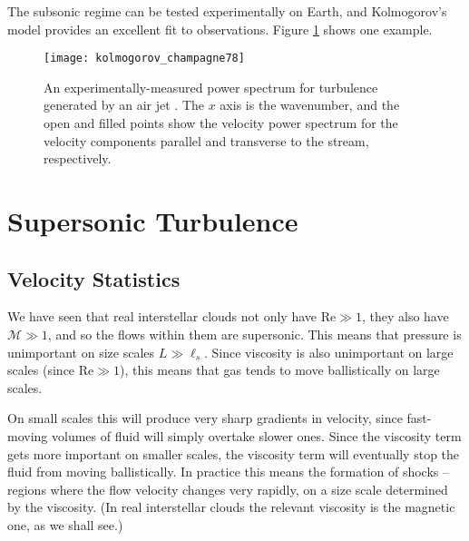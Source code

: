 The subsonic regime can be tested experimentally on Earth, and Kolmogorov's model provides an excellent fit to observations. Figure \ref{fig:kolmogorov} shows one example.

\begin{figure}
\texttt{[image: kolmogorov\_champagne78]}
\caption[Experimental Power Spectra for Kolmogorov Turbulence]{
\label{fig:kolmogorov}
An experimentally-measured power spectrum for turbulence generated by an air jet \citep{champagne78a}. The $x$ axis is the wavenumber, and the open and filled points show the velocity power spectrum for the velocity components parallel and transverse to the stream, respectively.
}
\end{figure}

\section{Supersonic Turbulence}

\subsection{Velocity Statistics}

We have seen that real interstellar clouds not only have $\mathrm{Re} \gg 1$, they also have $\mathcal{M} \gg 1$, and so the flows within them are supersonic. This means that pressure is unimportant on size scales $L \gg \ell_s$. Since viscosity is also unimportant on large scales (since $\mbox{Re} \gg 1$), this means that gas tends to move ballistically on large scales.

On small scales this will produce very sharp gradients in velocity, since fast-moving volumes of fluid will simply overtake slower ones. Since the viscosity term gets more important on smaller scales, the viscosity term will eventually stop the fluid from moving ballistically. In practice this means the formation of shocks -- regions where the flow velocity changes very rapidly, on a size scale determined by the viscosity. (In real interstellar clouds the relevant viscosity is the magnetic one, as we shall see.)

